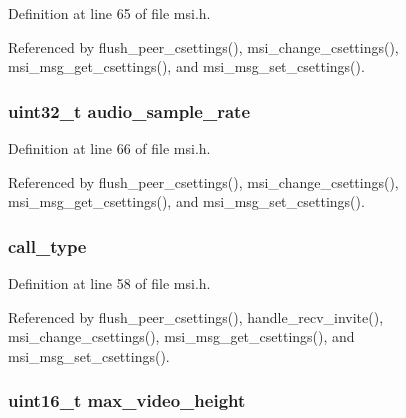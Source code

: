Definition at line 65 of file msi.\+h.



Referenced by flush\+\_\+peer\+\_\+csettings(), msi\+\_\+change\+\_\+csettings(), msi\+\_\+msg\+\_\+get\+\_\+csettings(), and msi\+\_\+msg\+\_\+set\+\_\+csettings().

\hypertarget{struct___m_s_i_codec_settings_a66da4482e934a2700e07a39fa0838559}{
\subsubsection[{audio\+\_\+sample\+\_\+rate}]{\setlength{\rightskip}{0pt plus 5cm}uint32\+\_\+t audio\+\_\+sample\+\_\+rate}}\label{struct___m_s_i_codec_settings_a66da4482e934a2700e07a39fa0838559}


Definition at line 66 of file msi.\+h.



Referenced by flush\+\_\+peer\+\_\+csettings(), msi\+\_\+change\+\_\+csettings(), msi\+\_\+msg\+\_\+get\+\_\+csettings(), and msi\+\_\+msg\+\_\+set\+\_\+csettings().

\hypertarget{struct___m_s_i_codec_settings_a24d841d0ab8a0b3f12f559aec494e4fe}{
\subsubsection[{call\+\_\+type}]{ call\+\_\+type}}\label{struct___m_s_i_codec_settings_a24d841d0ab8a0b3f12f559aec494e4fe}


Definition at line 58 of file msi.\+h.



Referenced by flush\+\_\+peer\+\_\+csettings(), handle\+\_\+recv\+\_\+invite(), msi\+\_\+change\+\_\+csettings(), msi\+\_\+msg\+\_\+get\+\_\+csettings(), and msi\+\_\+msg\+\_\+set\+\_\+csettings().

\hypertarget{struct___m_s_i_codec_settings_a4fef4b2fa1a8ae8446314ad0af4ce698}{
\subsubsection[{max\+\_\+video\+\_\+height}]{\setlength{\rightskip}{0pt plus 5cm}uint16\+\_\+t max\+\_\+video\+\_\+height}}\label{struct___m_s_i_codec_settings_a4fef4b2fa1a8ae8446314ad0af4ce698}


